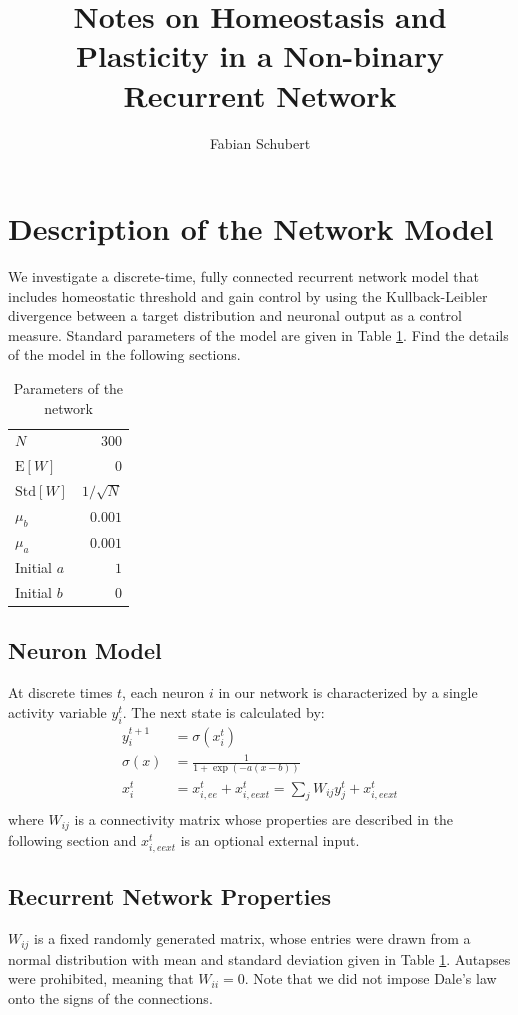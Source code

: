 \documentclass[10pt,a4paper]{article}
\author{Fabian Schubert}
\title{Notes on Homeostasis and Plasticity in a Non-binary Recurrent Network}
\begin{document}
\maketitle
\section{Description of the Network Model}
We investigate a discrete-time, fully connected recurrent network model that includes homeostatic threshold and gain control by using the Kullback-Leibler divergence between a target distribution and neuronal output as a control measure. Standard parameters of the model are given in Table \ref{tab:parameters}. Find the details of the model in the following sections.
\begin{table}
\centering
\caption{Parameters of the network}

\begin{tabular}{l|r}
$N$ & $300$ \\
$\mathrm{E}[W]$ &  $0$\\
$\mathrm{Std}[W]$ & $1/\sqrt{N}$ \\
$\mu_b$ & $0.001$ \\
$\mu_a$ & $0.001$ \\
Initial $a$ & $1$ \\
Initial $b$ & $0$
\end{tabular}
\label{tab:parameters}
\end{table}

\subsection{Neuron Model}
At discrete times $t$, each neuron $i$ in our network is characterized by a single activity variable $y^t_i$. The next state is calculated by:
\begin{align}
y^{t+1}_i &= \sigma\left(x^t_i\right) \\
\sigma\left(x\right) &= \frac{1}{1+\exp\left(-a\left(x-b\right)\right)} \\
x^t_i &= x^t_{i,ee} + x^t_{i,eext} = \sum_j W_{ij} y^t_j  + x^t_{i,eext} \\
\end{align}
where $W_{ij}$ is a connectivity matrix whose properties are described in the following section and $x^t_{i,eext}$ is an optional external input.

\subsection{Recurrent Network Properties}
$W_{ij}$ is a fixed randomly generated matrix, whose entries were drawn from a normal distribution with mean and standard deviation given in Table \ref{tab:parameters}. Autapses were prohibited, meaning that $W_{ii} = 0$. Note that we did not impose Dale's law onto the signs of the connections.
\end{document}
